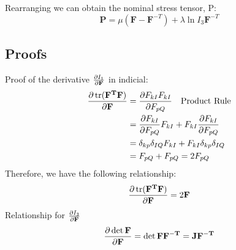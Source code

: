 \documentclass[12pt,3p]{article}
\begin{document}
Rearranging we can obtain the nominal stress tensor, P: 
\begin{equation}\label{P}
\mathbf{P} = \mu (\mathbf{F} - \mathbf{F}^{-T} ) + \lambda \ln I_3 \mathbf{F}^{-T}\end{equation}


\subsection{Proofs}
Proof of the derivative $\pdv{I_1}{\mathbf{F}}$ in indicial: 
\begin{align*}
\pdv{\trace(\mathbf{F^T} \mathbf{F})}{\mathbf{F}} &= \pdv{F_{kI} F_{kI}}{F_{pQ}} \quad \text{Product Rule}\\ 
									&= \pdv{F_{kI}}{F_{pQ}} F_{kI} + F_{kI} \pdv{F_{kI}}{F_{pQ}} \\
									&= \delta_{kp} \delta_{IQ} F_{kI} + F_{kI} \delta_{kp} \delta_{IQ} \\
									&= F_{pQ} + F_{pQ} = 2 F_{pQ}
\end{align*}
Therefore, we have the following relationship: 
\begin{equation}\label{proof1}
\pdv{\trace(\mathbf{F^T} \mathbf{F})}{\mathbf{F}} = 2 \mathbf{F}
\end{equation}
Relationship for $\pdv{I_3}{\mathbf{F}}$
\begin{align*}
\pdv{\det \mathbf{F} }{\mathbf{F}} = \det \mathbf{F} \mathbf{F^{-T}} = \mathbf{J} \mathbf{F^{-T}}
\end{align*}
\end{document}
